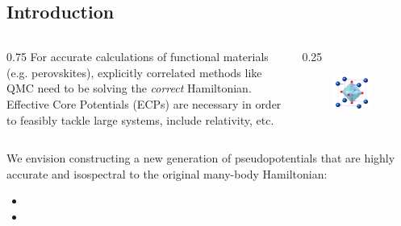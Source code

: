 \subsection{Introduction}
\begin{frame}
    \small
    \begin{columns}
	\begin{column}
	    {0.75\textwidth}
            For accurate calculations of functional materials (e.g. perovskites), explicitly correlated methods like QMC need to be solving the {\em correct} Hamiltonian. \\
            \bigskip 
            Effective Core Potentials (ECPs) are necessary in order to feasibly tackle large systems, include relativity, etc.\\
	\end{column}
	\begin{column}
	    {0.25\textwidth}
	    \begin{figure}[h]
		\centering
		\includegraphics[width=0.75\textwidth]{figures/material}
	    \end{figure}
	\end{column}
    \end{columns}
    \bigskip
  \color{ForestGreen}
  We envision constructing a new generation of pseudopotentials that are highly accurate and isospectral to the original many-body Hamiltonian:
  \begin{itemize}
    \item<2->[$\rightarrow$]  
    \item<3->[$\rightarrow$]  \color{black}{Tested and validated in many-body framework. Usable in both mean-field and many-body methods (in the spirit of the original all-electron $H$)}
  \end{itemize}
    

\end{frame}
